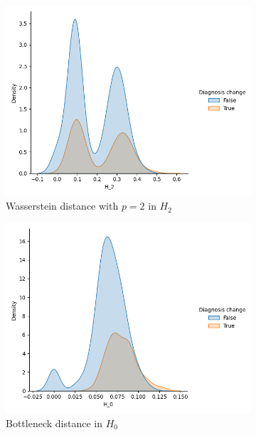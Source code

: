 \documentclass{article}
\begin{document}
\begin{figure}[htb]
\begin{subfigure}{0.32\textwidth}
    \includegraphics[width=\textwidth]{figures/temporal_evolution/wasserstein_H_2_dist_diag_change.png}
    \caption{Wasserstein distance with $p=2$ in $H_2$}
  \end{subfigure}
  \begin{subfigure}{0.32\textwidth}
    \includegraphics[width=\textwidth]{figures/temporal_evolution/bottleneck_H_0_dist_diag_change.png}
    \caption{Bottleneck distance in $H_0$}
  \end{subfigure}
  \begin{subfigure}{0.32\textwidth}

\end{subfigure}
\end{figure}
\end{document}
